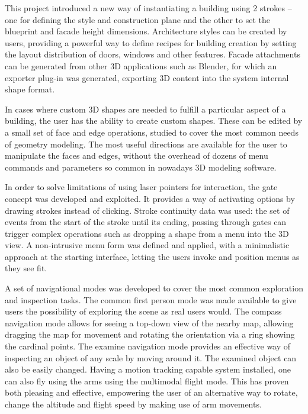 This project introduced a new way of instantiating a building using 2 strokes
-- one for defining the style and construction plane and the other to set the 
blueprint and facade height dimensions.
Architecture styles can be created by users, providing a 
powerful way to define recipes for building creation by setting the
layout distribution of doors, windows and other features.
Facade attachments can be generated from other 3D applications such as Blender,
for which an exporter plug-in was generated, exporting 3D content into the system internal shape format.

In cases where custom 3D shapes are needed to fulfill a particular aspect
of a building, the user has the ability to create custom shapes.
These can be edited by a small set of face and edge operations,
studied to cover the most common needs of geometry modeling.
The most useful directions are available for the user to manipulate the
faces and edges, without the overhead of dozens of menu commands and parameters
so common in nowadays 3D modeling software.

In order to solve limitations of using laser pointers
for interaction, the gate concept was developed and exploited.
It provides a way of activating options by drawing strokes instead of clicking.
Stroke continuity data was used: the set of events from the start of the stroke
until its ending, passing through gates can trigger complex operations
such as dropping a shape from a menu into the 3D view.
A non-intrusive menu form was defined and applied, with a minimalistic approach
at the starting interface, letting the users invoke and position menus as they see fit.

A set of navigational modes was developed to cover the most common exploration
and inspection tasks.
The common first person mode was made available to give users the
possibility of exploring the scene as real users would. 
The compass navigation mode allows for seeing a top-down view of the nearby map,
allowing dragging the map for movement and  rotating the orientation
via a ring showing the cardinal points.
The examine navigation mode provides an effective way of inspecting an object of any
scale by moving around it. The examined object can also be easily changed.
Having a motion tracking capable system installed, one can also fly using the arms
using the multimodal flight mode.
This has proven both pleasing and effective, empowering the user of an alternative
way to rotate, change the altitude and flight speed by making use of arm movements.



